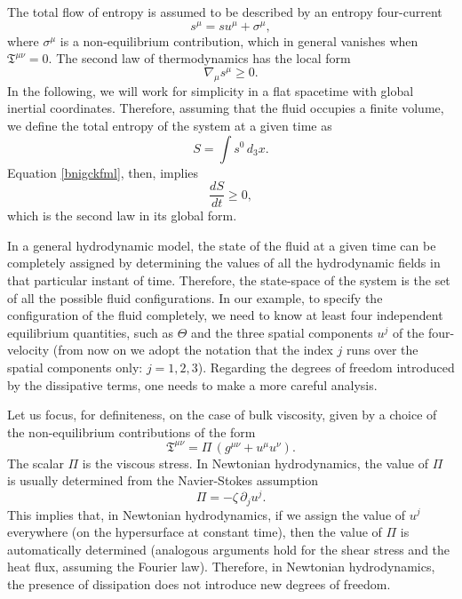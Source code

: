 \documentclass[a4paper, amsfonts, amssymb, amsmath, reprint, showkeys, nofootinbib, twoside]{revtex4-1}
\begin{document}
The total flow of entropy is assumed to be described by an entropy four-current
\begin{equation}
s^\mu = s u^\mu + \sigma^\mu,
\end{equation}
where $\sigma^\mu$ is a non-equilibrium contribution, which in general vanishes when $\mathfrak{T}^{\mu \nu}=0$. 
The second law of thermodynamics has the local form \citep{degroot_book,Israel_1981_review}
\begin{equation}\label{bnigckfml}
\nabla_\mu s^\mu \geq 0.
\end{equation}
In the following, we will work for simplicity in a flat spacetime with global inertial coordinates. 
Therefore, assuming that the fluid occupies a finite volume, we define the total entropy of the system at a given time as
\begin{equation}\label{bucatini}
S = \int s^0 \, d_3 x.
\end{equation}
Equation \eqref{bnigckfml}, then, implies   
\begin{equation}\label{zecondalegge}
\dfrac{dS}{dt} \geq 0,
\end{equation}
which is the second law in its global form.
 

In a general hydrodynamic model, the state of the fluid at a given time can be completely assigned by determining the values of all the hydrodynamic fields in that particular instant of time. Therefore, the state-space of the system is the set of all the possible fluid configurations. In our example, to specify the configuration of the fluid completely, we need to know at least four independent equilibrium quantities, such as $\Theta$ and the three spatial components $u^j$ of the four-velocity (from now on we adopt the notation that the index $j$ runs over the spatial components only: $j=1,2,3$). Regarding the degrees of freedom introduced by the dissipative terms, one needs to make a more careful analysis.

Let us focus, for definiteness, on the case of bulk viscosity, given by a choice of the non-equilibrium contributions of the form
\begin{equation}\label{bulkstress}
\mathfrak{T}^{\mu \nu} = \Pi \, (g^{\mu \nu}+u^\mu u^\nu).
\end{equation}
The scalar $\Pi$ is the viscous stress. In Newtonian hydrodynamics, the value of $\Pi$ is usually determined from the Navier-Stokes assumption
\begin{equation}\label{PIi}
\Pi = -\zeta \, \partial_j u^j.
\end{equation}
This implies that, in Newtonian hydrodynamics, if we assign the value of $u^j$ everywhere (on the hypersurface at constant time), then the value of $\Pi$ is automatically determined (analogous arguments hold for the shear stress and the heat flux, assuming the Fourier law). Therefore, in Newtonian hydrodynamics, the presence of dissipation does not introduce new degrees of freedom. 
\end{document}

